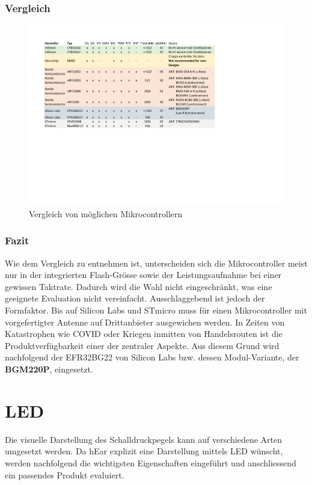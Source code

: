 \documentclass[12pt]{article}
\begin{document}
	\subsubsection{Vergleich}
	\begin{figure}[H]
		\centering
		\includegraphics[trim=55 260 230 50, width=1\linewidth]{tables/BAT_Vergleich-Mikrocontroller}
		\caption{Vergleich von möglichen Mikrocontrollern}
		\label{fig:batvergleich-mikrocontroller}
	\end{figure}
	\subsubsection{Fazit}
	Wie dem Vergleich zu entnehmen ist, unterscheiden sich die Mikrocontroller meist nur in der integrierten Flash-Grösse sowie der Leistungsaufnahme bei einer gewissen Taktrate. Dadurch wird die Wahl nicht eingeschränkt, was eine geeignete Evaluation nicht vereinfacht. Ausschlaggebend ist jedoch der Formfaktor. Bis auf Silicon Labs und STmicro muss für einen Mikrocontroller mit vorgefertigter Antenne auf Drittanbieter ausgewichen werden. In Zeiten von Katastrophen wie COVID oder Kriegen inmitten von Handelsrouten ist die Produktverfügbarkeit einer der zentraler Aspekte. Aus diesem Grund wird nachfolgend der EFR32BG22 von Silicon Labs bzw. dessen Modul-Variante, der \textbf{BGM220P}, eingesetzt.
	
	\newpage
	\section{LED}\label{LED}
	Die visuelle Darstellung des Schalldruckpegels kann auf verschiedene Arten umgesetzt werden. Da hEar explizit eine Darstellung mittels LED wünscht, werden nachfolgend die wichtigsten Eigenschaften eingeführt und anschliessend ein passendes Produkt evaluiert.
\end{document}
